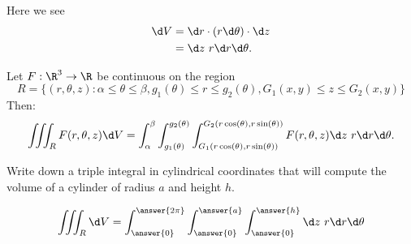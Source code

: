 \documentclass{ximera}
\begin{document}
\begin{image}
  \end{image}
Here we see 
\begin{align*}
\d V &= \d r \cdot (r \d \theta)\cdot \d z \\
&= \d z\ r \d r \d \theta.
\end{align*}
\begin{theorem}[Fubini]
  Let $F:\R^3\to\R$ be continuous on the region
  \[
  R=\{(r,\theta,z):\alpha\leq\theta\leq\beta, g_1(\theta)\leq r\leq g_2(\theta), G_1(x,y)\le z\le G_2(x,y)\}
  \]
  Then: 
  \[
  \iiint_R F(r,\theta,z)\d V = \int_\alpha^\beta\int_{g_1(\theta)}^{g_2(\theta)} \int_{G_1(r\cos(\theta),r\sin(\theta))}^{G_2(r\cos(\theta),r\sin(\theta))}F(r,\theta,z) \d z \ r\d r\d \theta.
  \]
\end{theorem}

\begin{question}
  Write down a triple integral in cylindrical coordinates that will
  compute the volume of a cylinder of radius $a$ and height $h$.
  \begin{prompt}
  \[
  \iiint_R \d V = \int_{\answer{0}}^{\answer{2\pi}}
  \int_{\answer{0}}^{\answer{a}}
  \int_{\answer{0}}^{\answer{h}}
  \d z \ r \d r \d \theta 
  \]
  \end{prompt}
\end{question}
\end{document}
